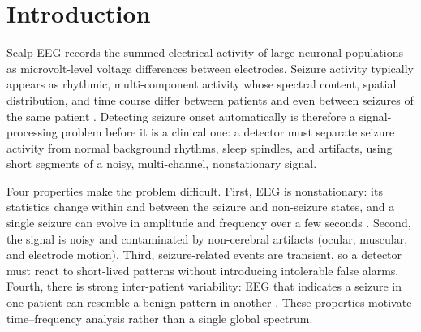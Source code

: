 \documentclass[10pt,twocolumn,letterpaper]{article}
\begin{document}
\begin{abstract}
\medskip
\noindent\textbf{Keywords:} EEG seizure detection, discrete wavelet transform (DWT), linear SVM, offline weight folding, dynamic wire-shifting, Spartan-7 FPGA, RealDigital Boolean Board, fixed-point arithmetic.

{\color{blue}
\medskip
\noindent\textbf{Final Project Milestone Update:}
This final report builds directly upon our preliminary proposal and mid-term report. The preliminary phase established the theoretical formulation and Boolean Board target. The mid-term milestone established the frozen 47-recording CHB-MIT benchmark, the Python floating-point LORO baseline (100.0\% sensitivity, 0.373\,FA/h), the Shoeb \& Guttag (2010) replication, and 4D ablation studies. This final submission delivers the complete physical realization: synthesizable Verilog RTL datapath, Vivado 100\,MHz timing closure on the Spartan-7 XC7S50, physical 230,400-baud UART streaming demonstration with board peripherals, and decision-level full-cohort fixed-point verification ($\Delta = 0.0\%$).
}
\end{abstract}

\section{Introduction}
\label{sec:intro}

Scalp EEG records the summed electrical activity of large neuronal populations as microvolt-level voltage differences between electrodes. Seizure activity typically appears as rhythmic, multi-component activity whose spectral content, spatial distribution, and time course differ between patients and even between seizures of the same patient \cite{shoeb2010icml}. Detecting seizure onset automatically is therefore a signal-processing problem before it is a clinical one: a detector must separate seizure activity from normal background rhythms, sleep spindles, and artifacts, using short segments of a noisy, multi-channel, nonstationary signal.

Four properties make the problem difficult. First, EEG is nonstationary: its statistics change within and between the seizure and non-seizure states, and a single seizure can evolve in amplitude and frequency over a few seconds \cite{shoeb2010icml}. Second, the signal is noisy and contaminated by non-cerebral artifacts (ocular, muscular, and electrode motion). Third, seizure-related events are transient, so a detector must react to short-lived patterns without introducing intolerable false alarms. Fourth, there is strong inter-patient variability: EEG that indicates a seizure in one patient can resemble a benign pattern in another \cite{shoeb2010icml}. These properties motivate time--frequency analysis rather than a single global spectrum.
\end{document}
